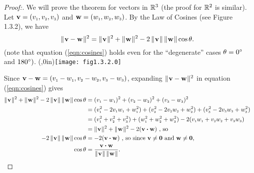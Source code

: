 \begin{proofbar}\begin{proof}[Proof:]
 We will prove the theorem for vectors in $\Real{3}$ (the proof for $\Real{2}$ is similar). Let
 $\mathbf{v} = \vecthree{v}$ and $\mathbf{w} = \vecthree{w}$. 
 By the Law of Cosines (see Figure 1.3.2), we
 have
 \begin{equation}\label{eqn:cosines}
  \norm{\mathbf{v} - \mathbf{w}}^2 = \norm{\mathbf{v}}^2 + \norm{\mathbf{w}}^2 -
  2\,\norm{\mathbf{v}}\,\norm{\mathbf{w}} \cos \theta.
 \end{equation}
 (note that equation (\ref{eqn:cosines}) holds even for the ``degenerate'' cases $\theta = 0\Degrees$ and $180\Degrees)$.
 \piccaption[]{}\parpic(\textwidth,0in){\texttt{[image: fig1.3.2.0]}\piccaptioninside}
 \par\mbox{}\newline\smallskip{}

 Since $\mathbf{v} - \mathbf{w} = \vecthreesub{v}{w}$, expanding $\norm{\mathbf{v} - \mathbf{w}}^2$
 in equation (\ref{eqn:cosines}) gives
 \begin{align*}
  \norm{\mathbf{v}}^2 + \norm{\mathbf{w}}^2 - 2\,\norm{\mathbf{v}}\,\norm{\mathbf{w}} \cos \theta &=
  (\ssub{v}{1} - \ssub{w}{1})^2 + (\ssub{v}{2} - \ssub{w}{2})^2 + (\ssub{v}{3} - \ssub{w}{3})^2\\
  &=
  (\ssub{v}{1}^2 - 2\ssub{v}{1}\ssub{w}{1} + \ssub{w}{1}^2) + (\ssub{v}{2}^2 - 2\ssub{v}{2}\ssub{w}{2} + \ssub{w}{2}^2)
  + (\ssub{v}{3}^2 - 2\ssub{v}{3}\ssub{w}{3} + \ssub{w}{3}^2)\\
  &= (\ssub{v}{1}^2 + \ssub{v}{2}^2 + \ssub{v}{3}^2) + (\ssub{w}{1}^2 + \ssub{w}{2}^2 + \ssub{w}{3}^2) -
  2(\ssub{v}{1}\ssub{w}{1} + \ssub{v}{2}\ssub{w}{2} + \ssub{v}{3}\ssub{w}{3})\\
  &=
  \norm{\mathbf{v}}^2 + \norm{\mathbf{w}}^2 - 2(\Dotprod{\mathbf{v}}{\mathbf{w}}) \text{~,~so}\\
  -2\,\norm{\mathbf{v}}\,\norm{\mathbf{w}} \cos \theta &= -2(\Dotprod{\mathbf{v}}{\mathbf{w}}) \text{~,~so since
  $\mathbf{v} \ne \mathbf{0}$ and $\mathbf{w} \ne \mathbf{0}$,}\\
  \cos \theta &= \frac{\Dotprod{\mathbf{v}}{\mathbf{w}}}{\norm{\mathbf{v}} \, \norm{\mathbf{w}}}.\qquad\qedhere
 \end{align*}
\end{proof}\end{proofbar}

